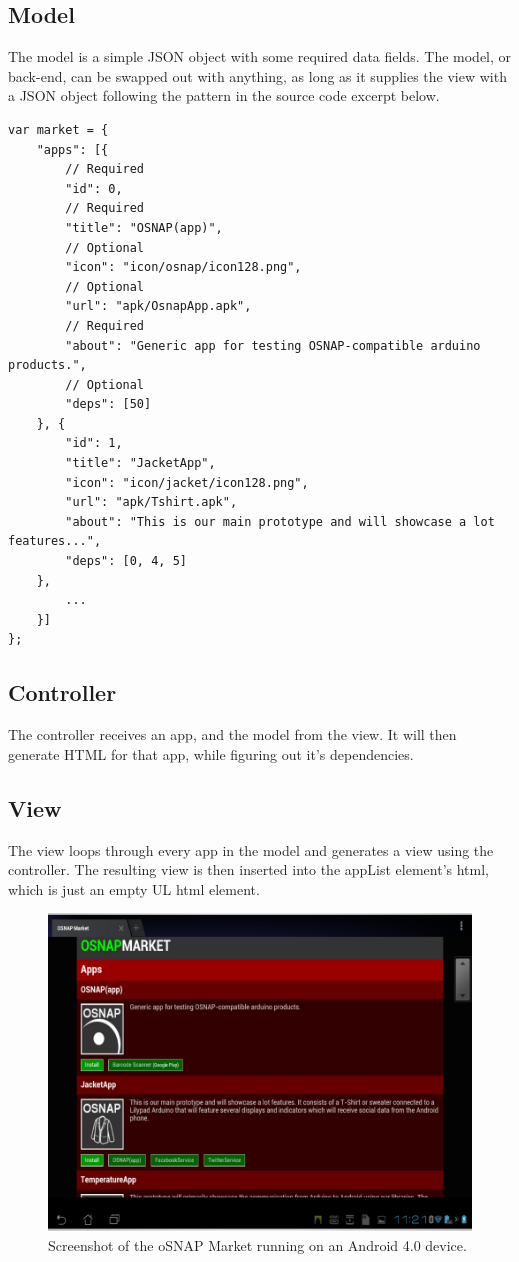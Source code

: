 \subsection{Model}
The model is a simple JSON object with some required data fields. The model, or back-end, can be swapped out with anything, as long as it supplies the view with a JSON object following the pattern in the source code excerpt below.
\javacode
\begin{lstlisting}
var market = {
    "apps": [{
        // Required
        "id": 0,
        // Required
        "title": "OSNAP(app)",
        // Optional
        "icon": "icon/osnap/icon128.png",
        // Optional
        "url": "apk/OsnapApp.apk",
        // Required
        "about": "Generic app for testing OSNAP-compatible arduino products.",
        // Optional
        "deps": [50]
    }, {
        "id": 1,
        "title": "JacketApp",
        "icon": "icon/jacket/icon128.png",
        "url": "apk/Tshirt.apk",
        "about": "This is our main prototype and will showcase a lot features...",
        "deps": [0, 4, 5]
    },
        ...
    }]
};
\end{lstlisting}

\subsection{Controller}
The controller receives an app, and the model from the view. It will then generate HTML for that app, while figuring out it's dependencies.

\subsection{View}
The view loops through every app in the model and generates a view using the controller. The resulting view is then inserted into the appList element's html, which is just an empty UL html element.

\begin{figure}
	\begin{center}
	\includegraphics[scale=0.4]{img/market-screen.png}
	\end{center}
	\caption{Screenshot of the oSNAP Market running on an Android 4.0 device.}
	\label{fig:market-screen}
\end{figure}
